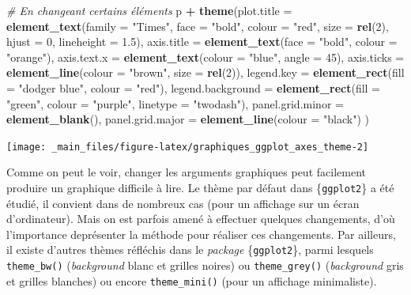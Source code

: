 \documentclass[
  11pt,
]{book}
\newenvironment{Shaded}{\begin{snugshade}}{\end{snugshade}}
\newcommand{\CommentTok}[1]{\textcolor[rgb]{0.56,0.35,0.01}{\textit{#1}}}
\newcommand{\DataTypeTok}[1]{\textcolor[rgb]{0.13,0.29,0.53}{#1}}
\newcommand{\DecValTok}[1]{\textcolor[rgb]{0.00,0.00,0.81}{#1}}
\newcommand{\FloatTok}[1]{\textcolor[rgb]{0.00,0.00,0.81}{#1}}
\newcommand{\KeywordTok}[1]{\textcolor[rgb]{0.13,0.29,0.53}{\textbf{#1}}}
\newcommand{\NormalTok}[1]{#1}
\newcommand{\OperatorTok}[1]{\textcolor[rgb]{0.81,0.36,0.00}{\textbf{#1}}}
\newcommand{\StringTok}[1]{\textcolor[rgb]{0.31,0.60,0.02}{#1}}
\numberwithin{equation}{section}
\numberwithin{countremarque}{section}
\begin{document}
\begin{Shaded}
\begin{Highlighting}[]
\CommentTok{\# En changeant certains éléments}
\NormalTok{p }\OperatorTok{+}\StringTok{ }\KeywordTok{theme}\NormalTok{(}\DataTypeTok{plot.title =} \KeywordTok{element\_text}\NormalTok{(}\DataTypeTok{family =} \StringTok{"Times"}\NormalTok{, }\DataTypeTok{face =} \StringTok{"bold"}\NormalTok{,}
                       \DataTypeTok{colour =} \StringTok{"red"}\NormalTok{,}
                       \DataTypeTok{size =} \KeywordTok{rel}\NormalTok{(}\DecValTok{2}\NormalTok{),}
                       \DataTypeTok{hjust =} \DecValTok{0}\NormalTok{,}
                       \DataTypeTok{lineheight =} \FloatTok{1.5}\NormalTok{),}
          \DataTypeTok{axis.title =} \KeywordTok{element\_text}\NormalTok{(}\DataTypeTok{face =} \StringTok{"bold"}\NormalTok{, }\DataTypeTok{colour =} \StringTok{"orange"}\NormalTok{),}
          \DataTypeTok{axis.text.x =} \KeywordTok{element\_text}\NormalTok{(}\DataTypeTok{colour =} \StringTok{"blue"}\NormalTok{, }\DataTypeTok{angle =} \DecValTok{45}\NormalTok{),}
          \DataTypeTok{axis.ticks =} \KeywordTok{element\_line}\NormalTok{(}\DataTypeTok{colour =} \StringTok{"brown"}\NormalTok{, }\DataTypeTok{size =} \KeywordTok{rel}\NormalTok{(}\DecValTok{2}\NormalTok{)),}
          \DataTypeTok{legend.key =} \KeywordTok{element\_rect}\NormalTok{(}\DataTypeTok{fill =} \StringTok{"dodger blue"}\NormalTok{, }\DataTypeTok{colour =} \StringTok{"red"}\NormalTok{),}
          \DataTypeTok{legend.background =} \KeywordTok{element\_rect}\NormalTok{(}\DataTypeTok{fill =} \StringTok{"green"}\NormalTok{,}
                                           \DataTypeTok{colour =} \StringTok{"purple"}\NormalTok{,}
                                           \DataTypeTok{linetype =} \StringTok{"twodash"}\NormalTok{),}
          \DataTypeTok{panel.grid.minor =} \KeywordTok{element\_blank}\NormalTok{(),}
          \DataTypeTok{panel.grid.major =} \KeywordTok{element\_line}\NormalTok{(}\DataTypeTok{colour =} \StringTok{"black"}\NormalTok{)}
\NormalTok{          )}
\end{Highlighting}
\end{Shaded}

\begin{center}\texttt{[image: \_main\_files/figure-latex/graphiques\_ggplot\_axes\_theme-2]} \end{center}

Comme on peut le voir, changer les arguments graphiques peut facilement produire un graphique difficile à lire. Le thème par défaut dans \{\texttt{ggplot2}\} a été étudié, il convient dans de nombreux cas (pour un affichage sur un écran d'ordinateur). Mais on est parfois amené à effectuer quelques changements, d'où l'importance deprésenter la méthode pour réaliser ces changements. Par ailleurs, il existe d'autres thèmes réfléchis dans le \emph{package} \{\texttt{ggplot2}\}, parmi lesquels \texttt{theme\_bw()} (\emph{background} blanc et grilles noires) ou \texttt{theme\_grey()} (\emph{background} gris et grilles blanches) ou encore \texttt{theme\_mini()} (pour un affichage minimaliste).
\end{document}
